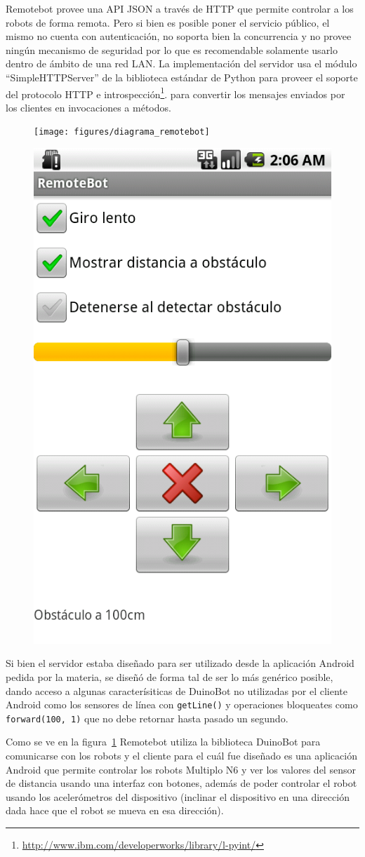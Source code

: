Remotebot provee una API JSON a través de HTTP que permite controlar a los
robots de forma remota. Pero si bien es posible poner el servicio público,
el mismo no cuenta con autenticación, no soporta bien la concurrencia
y no provee ningún mecanismo de seguridad por lo que es recomendable solamente
usarlo dentro de ámbito de una red LAN.
La implementación del servidor
usa el módulo ``SimpleHTTPServer'' de la biblioteca estándar de Python para
proveer el soporte del protocolo HTTP e
introspección\footnote{\url{http://www.ibm.com/developerworks/library/l-pyint/}}.
para convertir los
mensajes enviados por los clientes en invocaciones a métodos.

\begin{figure}
    \centering
    \texttt{[image: figures/diagrama\_remotebot]}
    \label{fig:diagrama_remotebot}
\end{figure}
\begin{figure}
    \centering
    \includegraphics[width=.20\textwidth]{figures/cliente_remotebot}
    \label{fig:cliente_remotebot}
\end{figure}

Si bien el servidor estaba diseñado para ser utilizado desde la
aplicación Android pedida por la materia,
se diseñó de forma tal de ser lo más genérico posible, dando acceso
a algunas caracterísiticas de DuinoBot no utilizadas por el cliente
Android como los sensores de línea con \texttt{getLine()} y operaciones
bloqueates como \texttt{forward(100, 1)} que no debe retornar
hasta pasado un segundo.

Como se ve en la figura~\ref{fig:diagrama_remotebot} Remotebot utiliza la
biblioteca DuinoBot para comunicarse con los robots y el cliente para el cuál
fue diseñado es una aplicación Android que permite controlar los robots
Multiplo N6
y ver los valores del sensor de distancia usando una interfaz con botones,
además de poder controlar el robot usando los acelerómetros del dispositivo
(inclinar el dispositivo en una dirección dada hace que el robot se mueva
en esa dirección).


